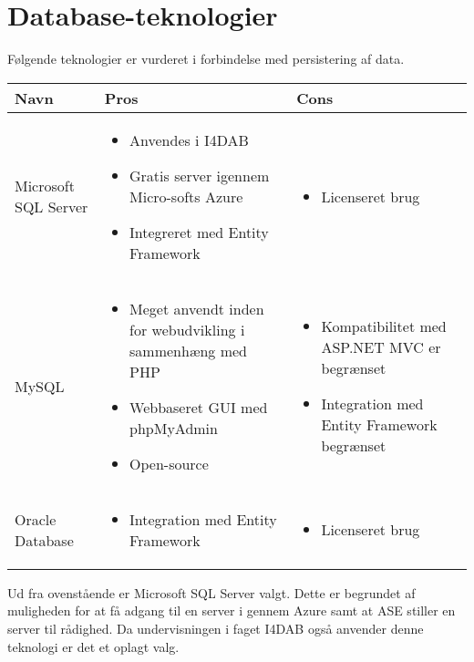 \section{Database-teknologier}

Følgende teknologier er vurderet i forbindelse med persistering af data.

\begin{savenotes}
\begin{tabular}{|p{3cm}|p{5.5cm}|p{5.5cm}|}
\hline 
\textbf{Navn} & \textbf{Pros} & \textbf{Cons} \\ 
\hline

Microsoft SQL Server
	&
	\begin{itemize}
		\item Anvendes i I4DAB
		\item Gratis server igennem Micro-softs Azure \citep{msazureWeb}
		\item Integreret med Entity Framework
	\end{itemize}
	&
	\begin{itemize}
		\item Licenseret brug
	\end{itemize}
	\\
	\hline

MySQL
	&
	\begin{itemize}
		\item Meget anvendt inden for webudvikling i sammenhæng med PHP
		\item Webbaseret GUI med phpMyAdmin \citep{phpMyAdminWeb}
		\item Open-source
	\end{itemize}
	&
	\begin{itemize}
		\item Kompatibilitet med ASP.NET MVC er begrænset
		\item Integration med Entity Framework begrænset
	\end{itemize}
	\\
	\hline

Oracle Database
	&
	\begin{itemize}
		\item Integration med Entity Framework
	\end{itemize}
	&
	\begin{itemize}
	\item Licenseret brug
	\end{itemize}
	\\
	\hline
\end{tabular}
\end{savenotes} 

Ud fra ovenstående er Microsoft SQL Server valgt. Dette er begrundet af muligheden for at få adgang til en server i gennem Azure samt at ASE stiller en server til rådighed. Da undervisningen i faget I4DAB også anvender denne teknologi er det et oplagt valg.